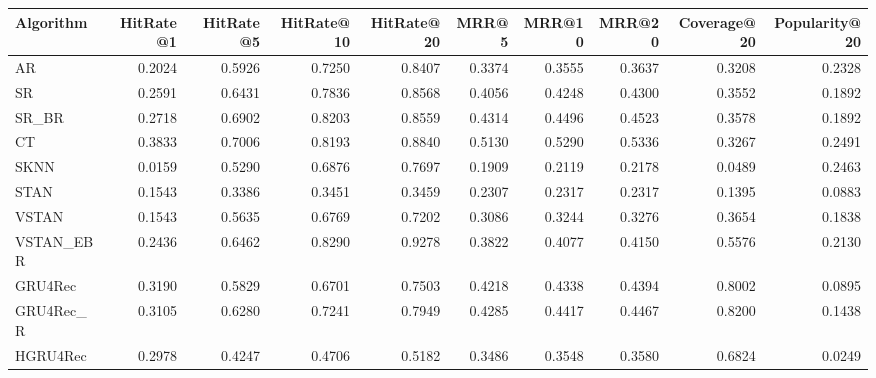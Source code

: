 \begin{tabular}{lrrrrrrrrr}
\toprule
 Algorithm &  HitRate@1 &  HitRate@5 &  HitRate@10 &  HitRate@20 &   MRR@5 &  MRR@10 &  MRR@20 &  Coverage@20 &  Popularity@20 \\
\midrule
        AR &     0.2024 &     0.5926 &      0.7250 &      0.8407 &  0.3374 &  0.3555 &  0.3637 &       0.3208 &         0.2328 \\
        SR &     0.2591 &     0.6431 &      0.7836 &      0.8568 &  0.4056 &  0.4248 &  0.4300 &       0.3552 &         0.1892 \\
     SR\_BR &     0.2718 &     0.6902 &      0.8203 &      0.8559 &  0.4314 &  0.4496 &  0.4523 &       0.3578 &         0.1892 \\
        CT &     0.3833 &     0.7006 &      0.8193 &      0.8840 &  0.5130 &  0.5290 &  0.5336 &       0.3267 &         0.2491 \\
      SKNN &     0.0159 &     0.5290 &      0.6876 &      0.7697 &  0.1909 &  0.2119 &  0.2178 &       0.0489 &         0.2463 \\
      STAN &     0.1543 &     0.3386 &      0.3451 &      0.3459 &  0.2307 &  0.2317 &  0.2317 &       0.1395 &         0.0883 \\
     VSTAN &     0.1543 &     0.5635 &      0.6769 &      0.7202 &  0.3086 &  0.3244 &  0.3276 &       0.3654 &         0.1838 \\
 VSTAN\_EBR &     0.2436 &     0.6462 &      0.8290 &      0.9278 &  0.3822 &  0.4077 &  0.4150 &       0.5576 &         0.2130 \\
   GRU4Rec &     0.3190 &     0.5829 &      0.6701 &      0.7503 &  0.4218 &  0.4338 &  0.4394 &       0.8002 &         0.0895 \\
 GRU4Rec\_R &     0.3105 &     0.6280 &      0.7241 &      0.7949 &  0.4285 &  0.4417 &  0.4467 &       0.8200 &         0.1438 \\
  HGRU4Rec &     0.2978 &     0.4247 &      0.4706 &      0.5182 &  0.3486 &  0.3548 &  0.3580 &       0.6824 &         0.0249 \\
\bottomrule
\end{tabular}
